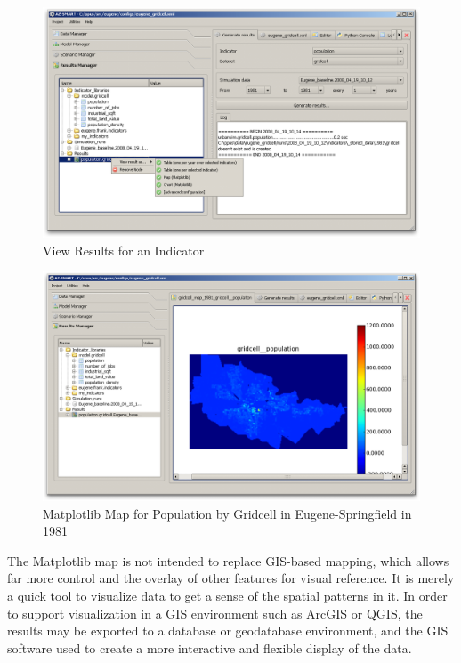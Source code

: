\begin{figure}[htp]
\begin{center}
\includegraphics[scale=0.4]{graphics/opus-indicator-view-1.png}
\end{center}
\caption{View Results for an Indicator}
\label{fig:opus-indicator-view-1}
\end{figure}

\begin{figure}[htp]
\begin{center}
\includegraphics[scale=0.4]{graphics/opus-indicator-view-2.png}
\end{center}
\caption{Matplotlib Map for Population by Gridcell in Eugene-Springfield in 1981}
\label{fig:opus-indicator-view-2}
\end{figure}

The Matplotlib map is not intended to replace GIS-based mapping, which allows far more control and the overlay of other features for visual reference.  It is merely a quick tool to visualize data to get a sense of the spatial patterns in it.  In order to support visualization in a GIS environment such as ArcGIS or QGIS, the results may be exported to a database or geodatabase environment, and the GIS software used to create a more interactive and flexible display of the data.

